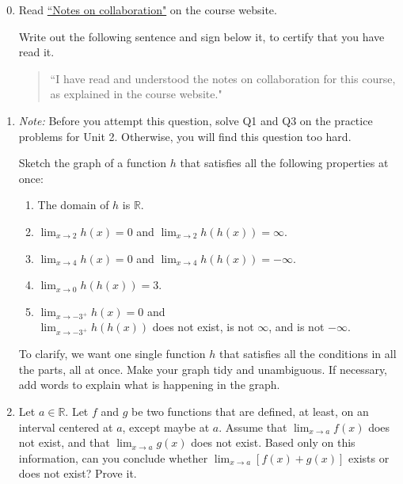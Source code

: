 \documentclass[12pt]{exam}
\newcommand {\DS} [1] {${\displaystyle #1}$}
\newcommand{\vv}{\vspace{.2cm}}
\newcommand{\R}{\mathbb{R}}
\begin{document}
\begin{enumerate}

\setcounter{enumi}{-1}

\item Read \href{https://www.math.toronto.edu/~alfonso/137/PS/137_2021_collaboration.pdf}{``Notes on collaboration"} on the course website.

	Write out the following sentence and sign below it, to certify that you have read it.
	
	\begin{quote}
		``I have read and understood the notes on collaboration for this course, as explained in the course website."
	\end{quote}

\vv

\item \emph{Note:} Before you attempt this question, solve Q1 and Q3 on the practice problems for Unit 2.  Otherwise, you will find this question too hard.

  Sketch the graph of a function $h$ that satisfies all the following properties at once:
	\begin{enumerate}
		\item The domain of $h$ is $\R$.
		\item  \DS{\lim_{x \to 2} h(x) = 0} \; and \; \DS{\lim_{x \to 2} h(h(x)) = \infty}.
		\item  \DS{\lim_{x \to 4} h(x) = 0} \; and \; \DS{\lim_{x \to 4} h(h(x)) = - \infty}.
		\item \DS{\lim_{x \to 0} h(h(x))=3}.
		\item  \DS{\lim_{x \to -3^+} h(x) = 0} \; and \\
		   \DS{\lim_{x \to -3^+} h(h(x))} does not exist, is not $\infty$, and is not $-\infty$.
	\end{enumerate}
	To clarify, we want one single function $h$ that satisfies all the conditions in all the parts, all at once.  Make your graph tidy and unambiguous.  If necessary, add words to explain what is happening in the graph.  
\vv

\item  Let \DS{a \in \R}.  Let $f$ and $g$ be two functions that are defined, at least, on an interval centered at $a$, except maybe at $a$.  
Assume that \DS{\lim_{x \to a} f(x)} does not exist, and that \DS{\lim_{x \to a} g(x)} does not exist.  Based only on this information, can you conclude whether \DS{\lim_{x \to a}\left[f(x) + g(x) \right]} exists or does not exist?  Prove it.


\end{enumerate}
\end{document}
